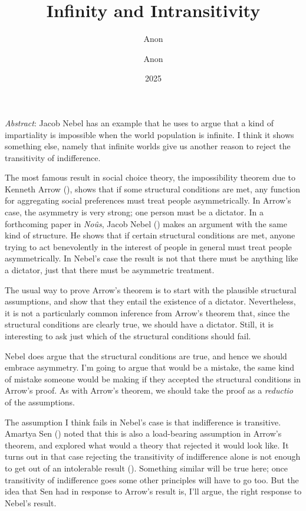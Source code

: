 \documentclass[
  11pt,
  letterpaper,
  DIV=11,
  numbers=noendperiod,
  twoside]{scrartcl}
\author{Anon}
\title{Infinity and Intransitivity}
\author{Anon}
\date{2025}
\renewenvironment{abstract}
 {\vspace{-1.25cm}
 \quotation\small\noindent\emph{Abstract}:}
 {\endquotation}
\renewenvironment{abstract}
 {\vspace{-0.75cm}
 \quotation\small\noindent\emph{Abstract}:}
 {\endquotation}
\begin{document}
\maketitle
\begin{abstract}
Jacob Nebel has an example that he uses to argue that a kind of
impartiality is impossible when the world population is infinite. I
think it shows something else, namely that infinite worlds give us
another reason to reject the transitivity of indifference.
\end{abstract}


The most famous result in social choice theory, the impossibility
theorem due to Kenneth Arrow (), shows
that if some structural conditions are met, any function for aggregating
social preferences must treat people asymmetrically. In Arrow's case,
the asymmetry is very strong; one person must be a dictator. In a
forthcoming paper in \emph{Noûs}, Jacob Nebel
() makes an argument with the same kind of
structure. He shows that if certain structural conditions are met,
anyone trying to act benevolently in the interest of people in general
must treat people asymmetrically. In Nebel's case the result is not that
there must be anything like a dictator, just that there must be
asymmetric treatment.

The usual way to prove Arrow's theorem is to start with the plausible
structural assumptions, and show that they entail the existence of a
dictator. Nevertheless, it is not a particularly common inference from
Arrow's theorem that, since the structural conditions are clearly true,
we should have a dictator. Still, it is interesting to ask just which of
the structural conditions should fail.

Nebel does argue that the structural conditions are true, and hence we
should embrace asymmetry. I'm going to argue that would be a mistake,
the same kind of mistake someone would be making if they accepted the
structural conditions in Arrow's proof. As with Arrow's theorem, we
should take the proof as a \emph{reductio} of the assumptions.

The assumption I think fails in Nebel's case is that indifference is
transitive. Amartya Sen ()
noted that this is also a load-bearing assumption in Arrow's theorem,
and explored what would a theory that rejected it would look like. It
turns out in that case rejecting the transitivity of indifference alone
is not enough to get out of an intolerable result
(). Something similar will be
true here; once transitivity of indifference goes some other principles
will have to go too. But the idea that Sen had in response to Arrow's
result is, I'll argue, the right response to Nebel's result.
\end{document}
